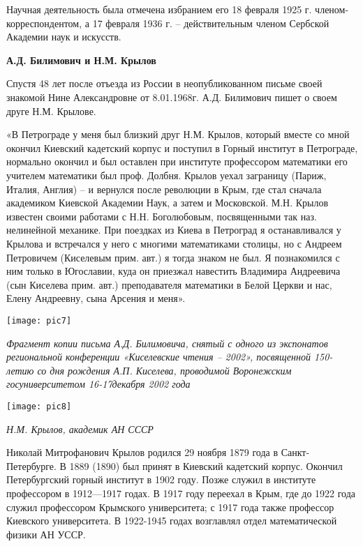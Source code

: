 Научная деятельность была отмечена избранием его 18 февраля 1925 г. членом-корреспондентом, а 17 февраля 1936 г. – действительным членом Сербской Академии наук и искусств.

\begin{center}
{\bf А.Д. Билимович и Н.М. Крылов}
\end{center}

Спустя 48 лет после отъезда из России в неопубликованном письме своей знакомой Нине Александровне от 8.01.1968г. А.Д. Билимович пишет о своем друге Н.М. Крылове.

«В Петрограде у меня был близкий друг Н.М. Крылов, который вместе со мной окончил Киевский кадетский корпус и поступил в Горный институт в Петрограде, нормально окончил и был оставлен при институте профессором математики его учителем математики был проф. Долбня. Крылов уехал заграницу (Париж, Италия, Англия) – и вернулся после революции в Крым, где стал сначала академиком Киевской Академии Наук, а затем и Московской. М.Н. Крылов известен своими работами с Н.Н. Боголюбовым, посвященными так наз. нелинейной механике. При поездках из Киева в Петроград я останавливался у Крылова и встречался у него с многими математиками столицы, но с Андреем Петровичем (Киселевым прим. авт.) я тогда знаком не был. Я познакомился с ним только в Югославии, куда он приезжал навестить Владимира Андреевича (сын Киселева прим. авт.) преподавателя математики в Белой Церкви и нас, Елену Андреевну, сына Арсения и меня».

\begin{center}
\texttt{[image: pic7]}

{\it Фрагмент копии письма А.Д. Билимовича, снятый с одного из экспонатов региональной конференции «Киселевские чтения – 2002», посвященной 150-летию со дня рождения А.П. Киселева, проводимой Воронежским госуниверситетом 16-17декабря 2002 года}
\end{center}

\begin{center}
\texttt{[image: pic8]}

{\it Н.М. Крылов, академик АН СССР}
\end{center}

Николай Митрофанович Крылов родился 29 ноября 1879 года в Санкт-Петербурге. В 1889 (1890) был принят в Киевский кадетский корпус. Окончил Петербургский горный институт в 1902 году. Позже служил в институте профессором в 1912—1917 годах. В 1917 году переехал в Крым, где до 1922 года служил профессором Крымского университета; с 1917 года также профессор Киевского университета. В 1922-1945 годах возглавлял отдел математической физики АН УССР.


